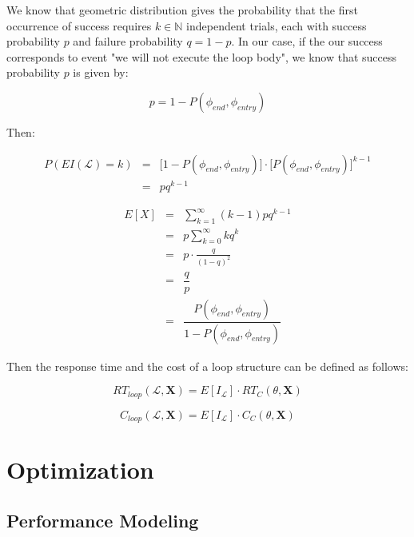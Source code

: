\documentclass[10pt,a4paper]{report}
\newcommand*{\N}{\mathbb{N}}
\theoremstyle{definition}
\begin{document}
We know that geometric distribution gives the probability that the first occurrence of success requires $k \in \N$ independent trials, each with success probability $p$ and failure probability $q = 1 - p$. In our case, if the our success corresponds to event "we will not execute the loop body", we know that success probability $p$ is given by:

\begin{equation}
	p = 1 - P(\phi_{end}, \phi_{entry})
\end{equation}

Then:

\begin{eqnarray}
	P(EI(\mathcal{L}) = k) & = & \Big[  1 - P(\phi_{end}, \phi_{entry}) \Big] \cdot \bigg[  P(\phi_{end}, \phi_{entry}) \bigg] ^{k-1} \\
	& = & pq^{k-1}
\end{eqnarray}

\begin{eqnarray}
	E[X] & = & \sum_{k = 1}^\infty (k-1) pq^{k-1} \nonumber \\
	& = & p \sum_{k = 0}^\infty kq^{k} \nonumber \\
	& = & p \cdot \frac{q}{(1-q)^2} \nonumber \\
	& = & \dfrac{q}{p} \nonumber \\
	& = & \dfrac{P(\phi_{end}, \phi_{entry})}{1 - P(\phi_{end}, \phi_{entry})} 
\end{eqnarray}

Then the response time and the cost of a loop structure can be defined as follows:

\begin{equation}
	RT_{loop}(\mathcal{L}, \textbf{X}) = E[I_{\mathcal{L}}] \cdot RT_C(\theta, \textbf{X})
\end{equation}

\begin{equation}
	C_{loop}(\mathcal{L}, \textbf{X}) = E[I_{\mathcal{L}}] \cdot C_C(\theta, \textbf{X})
\end{equation}




\section{Optimization}


\subsection{Performance Modeling}
\end{document}
